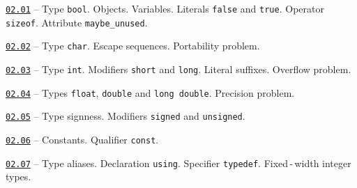 \documentclass[a4paper,12pt]{article}
\renewenvironment{itemize}
{
    \begin{list}{\labelitemi}
    {
      \setlength{\topsep}{0pt}
      \setlength{\partopsep}{0pt}
      \setlength{\parskip}{0pt}
      \setlength{\itemsep}{0pt}
      \setlength{\parsep}{0pt}
      \setlength{\leftmargin}{14.5pt}
    }
}{\end{list}}
\begin{document}
\begin{itemize}
    
    \item \href{https://github.com/i-s-m-mipt/Education/blob/master/projects/examples/source/02.01.cpp}{\texttt{02.01}} -- Type \lstinline{bool}. Objects. Variables. Literals \lstinline{false} and \lstinline{true}. Operator \lstinline{sizeof}. Attribute \lstinline{maybe_unused}.

    \smallskip

    \item \href{https://github.com/i-s-m-mipt/Education/blob/master/projects/examples/source/02.02.cpp}{\texttt{02.02}} -- Type \lstinline{char}. Escape sequences. Portability problem.

    \smallskip

    \item \href{https://github.com/i-s-m-mipt/Education/blob/master/projects/examples/source/02.03.cpp}{\texttt{02.03}} -- Type \lstinline{int}. Modifiers \lstinline{short} and \lstinline{long}. Literal suffixes. Overflow problem.

    \smallskip
    
    \item \href{https://github.com/i-s-m-mipt/Education/blob/master/projects/examples/source/02.04.cpp}{\texttt{02.04}} -- Types \lstinline{float}, \lstinline{double} and \lstinline{long double}. Precision problem.

    \smallskip

    \item \href{https://github.com/i-s-m-mipt/Education/blob/master/projects/examples/source/02.05.cpp}{\texttt{02.05}} -- Type signness. Modifiers \lstinline{signed} and \lstinline{unsigned}.

    \smallskip

    \item \href{https://github.com/i-s-m-mipt/Education/blob/master/projects/examples/source/02.06.cpp}{\texttt{02.06}} -- Constants. Qualifier \lstinline{const}.

    \smallskip

    \item \href{https://github.com/i-s-m-mipt/Education/blob/master/projects/examples/source/02.07.cpp}{\texttt{02.07}} -- Type aliases. Declaration \lstinline{using}. Specifier \lstinline{typedef}. Fixed\,-\,width integer types.
    
\end{itemize}
\end{document}
